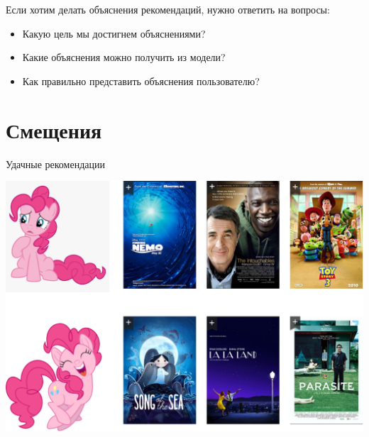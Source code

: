 \documentclass[11pt,aspectratio=169,handout]{beamer}
\begin{document}
\begin{frame}

\begin{tcolorbox}[colback=info!5,colframe=info!80,title=]
Если хотим делать объяснения рекомендаций, нужно ответить на вопросы:
\begin{itemize}
\item Какую цель мы достигнем объяснениями?
\item Какие объяснения можно получить из модели?
\item Как правильно представить объяснения пользователю?
\end{itemize}
\end{tcolorbox}

\end{frame}

\section{Смещения}

\begin{frame}{Удачные рекомендации}

\begin{center}
\includegraphics[scale=0.22]{images/serendipity-pony.png}
\end{center}

\end{frame}
\end{document}
